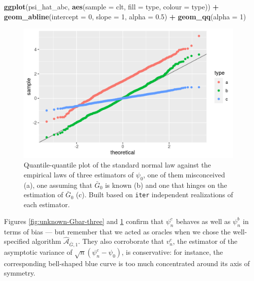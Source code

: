 \documentclass[11pt,openright,twoside]{book}
\newenvironment{Shaded}{\begin{snugshade}}{\end{snugshade}}
\newcommand{\DataTypeTok}[1]{\textcolor[rgb]{0.13,0.29,0.53}{#1}}
\newcommand{\DecValTok}[1]{\textcolor[rgb]{0.00,0.00,0.81}{#1}}
\newcommand{\FloatTok}[1]{\textcolor[rgb]{0.00,0.00,0.81}{#1}}
\newcommand{\KeywordTok}[1]{\textcolor[rgb]{0.13,0.29,0.53}{\textbf{#1}}}
\newcommand{\NormalTok}[1]{#1}
\newcommand{\OperatorTok}[1]{\textcolor[rgb]{0.81,0.36,0.00}{\textbf{#1}}}
\newcommand{\StringTok}[1]{\textcolor[rgb]{0.31,0.60,0.02}{#1}}
\newcommand{\Algo}{\widehat{\mathcal{A}}}
\newcommand{\Gbar}{\bar{G}}
\theoremstyle{definition}
\theoremstyle{definition}
\theoremstyle{definition}
\theoremstyle{remark}
\begin{document}
\begin{Shaded}
\begin{Highlighting}[]
\KeywordTok{ggplot}\NormalTok{(psi_hat_abc, }\KeywordTok{aes}\NormalTok{(}\DataTypeTok{sample =}\NormalTok{ clt, }\DataTypeTok{fill =}\NormalTok{ type, }\DataTypeTok{colour =}\NormalTok{ type)) }\OperatorTok{+}
\StringTok{  }\KeywordTok{geom_abline}\NormalTok{(}\DataTypeTok{intercept =} \DecValTok{0}\NormalTok{, }\DataTypeTok{slope =} \DecValTok{1}\NormalTok{, }\DataTypeTok{alpha =} \FloatTok{0.5}\NormalTok{) }\OperatorTok{+}
\StringTok{  }\KeywordTok{geom_qq}\NormalTok{(}\DataTypeTok{alpha =} \DecValTok{1}\NormalTok{)}
\end{Highlighting}
\end{Shaded}

\begin{figure}

{\centering \includegraphics[width=0.7\linewidth]{img/unknown-Gbar-four-1} 

}

\caption{Quantile-quantile plot of the standard normal law against the empirical laws of three estimators of \(\psi_{0}\), one of them misconceived (a), one assuming that \(\Gbar_{0}\) is known (b) and one that hinges on the estimation of \(\Gbar_{0}\) (c). Built based on \texttt{iter} independent realizations of each estimator.}\label{fig:unknown-Gbar-four}
\end{figure}

Figures \ref{fig:unknown-Gbar-three} and \ref{fig:unknown-Gbar-four} confirm
that \(\psi_{n}^{c}\) behaves as well as \(\psi_{n}^{b}\) in terms of bias --- but
remember that we acted as oracles when we chose the well-specified algorithm
\(\Algo_{\Gbar,1}\). They also corroborate that \(v_{n}^{c}\), the estimator of
the asymptotic variance of \(\sqrt{n} (\psi_{n}^{c} - \psi_{0})\), is
conservative: for instance, the corresponding bell-shaped blue curve is too
much concentrated around its axis of symmetry.
\end{document}
